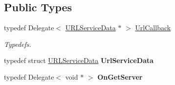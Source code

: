 \subsection*{Public Types}
\begin{DoxyCompactItemize}
\item 
\mbox{\label{class_u_r_l_service_a0459fed277e6b3e9f933e89f06b05e18}} 
typedef Delegate$<$ \hyperlink{struct_u_r_l_service_1_1_u_r_l_service_data}{U\+R\+L\+Service\+Data} $\ast$ $>$ \hyperlink{class_u_r_l_service_a0459fed277e6b3e9f933e89f06b05e18}{Url\+Callback}
\begin{DoxyCompactList}\small\item\em Typedefs. \end{DoxyCompactList}\item 
\mbox{\label{class_u_r_l_service_aac1d1778b4dbc7294458a040708a99e5}} 
typedef struct \hyperlink{struct_u_r_l_service_1_1_u_r_l_service_data}{U\+R\+L\+Service\+Data} {\bfseries Url\+Service\+Data}
\item 
\mbox{\label{class_u_r_l_service_a77bd0c8070fc2735e46b95443a3b9c9b}} 
typedef Delegate$<$ void $\ast$ $>$ {\bfseries On\+Get\+Server}
\end{DoxyCompactItemize}
